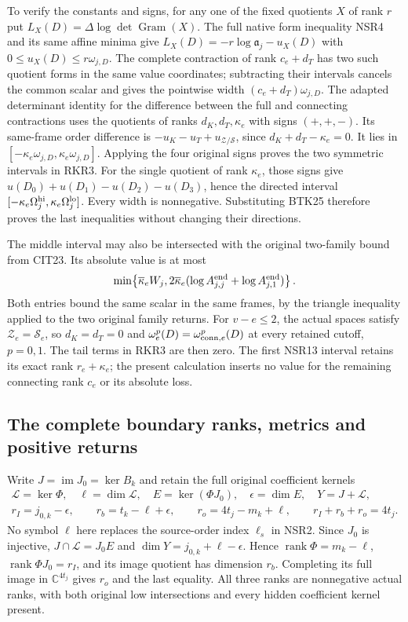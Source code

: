 \documentclass[11pt,a4paper]{article}
\begin{document}
To verify the constants and signs, for any one of the fixed
quotients $X$ of rank $r$ put
$L_X(D)=\Delta\log\det\operatorname{Gram}(X)$.
The full native form inequality NSR4 and its same affine
minima give
$L_X(D)=-r\log\mathfrak a_j-u_X(D)$ with
$0\le u_X(D)\le r\omega_{j,D}$.
The complete contraction of rank $c_e+d_T$ has two such
quotient forms in the same value coordinates; subtracting
their intervals cancels the common scalar and gives the
pointwise width $(c_e+d_T)\omega_{j,D}$.
The adapted determinant identity for the difference between
the full and connecting contractions uses the quotients
of ranks $d_K,d_T,\kappa_e$ with signs $(+,+,-)$.
Its same-frame order difference is
$-u_K-u_T+u_{\mathscr Z/\mathscr S}$, since
$d_K+d_T-\kappa_e=0$.
It lies in $[-\kappa_e\omega_{j,D},
\kappa_e\omega_{j,D}]$. Applying the four original signs
proves the two symmetric intervals in RKR3.
For the single quotient of rank $\kappa_e$, those signs give
$u(D_0)+u(D_1)-u(D_2)-u(D_3)$, hence the directed interval
$[-\kappa_e\Omega_j^{\rm hi},\kappa_e\Omega_j^{\rm lo}]$.
Every width is nonnegative. Substituting BTK25 therefore
proves the last inequalities without changing their directions.

The middle interval may also be intersected with the original
two-family bound from CIT23. Its absolute value is at most
\[
\min\!\left\{\overline\kappa_e W_j,
 2\overline\kappa_e
  (\log A_{j,j}^{\rm end}+\log A_{j,1}^{\rm end})\right\}.
\]
Both entries bound the same scalar in the same frames, by the
triangle inequality applied to the two original family returns.
For $v-e\le2$, the actual spaces satisfy
$\mathscr Z_e=\mathscr S_e$, so $d_K=d_T=0$ and
$\omega_e^p(D)=\omega_{{\rm conn},e}^p(D)$ at every retained
cutoff, $p=0,1$. The tail terms in RKR3 are then zero.
The first NSR13 interval retains its exact rank
$r_e+\kappa_e$; the present calculation inserts no value
for the remaining connecting rank $c_e$ or its absolute loss.




\subsection{The complete boundary ranks, metrics and positive returns}
Write $J=\operatorname{im}J_0=\ker B_k$ and retain the
full original coefficient kernels
\[
 \begin{gathered}
 \mathscr L=\ker\Phi,\quad \ell=\dim\mathscr L,\quad
 E=\ker(\Phi J_0),\quad\epsilon=\dim E,\quad Y=J+\mathscr L,\\
 r_I=j_{0,k}-\epsilon,\qquad
 r_b=t_k-\ell+\epsilon,\qquad
 r_o=4t_j-m_k+\ell,\qquad r_I+r_b+r_o=4t_j .
 \end{gathered}\tag{NSR16}
\]
No symbol $\ell$ here replaces the source-order index
$\ell_s$ in NSR2. Since $J_0$ is injective,
$J\cap\mathscr L=J_0E$ and $\dim Y=j_{0,k}+\ell-\epsilon$.
Hence $\operatorname{rank}\Phi=m_k-\ell$,
$\operatorname{rank}\Phi J_0=r_I$, and its image quotient
has dimension $r_b$. Completing its full image in
$\mathbb C^{4t_j}$ gives $r_o$ and the last equality.
All three ranks are nonnegative actual ranks, with both
original low intersections and every hidden coefficient
kernel present.
\end{document}
